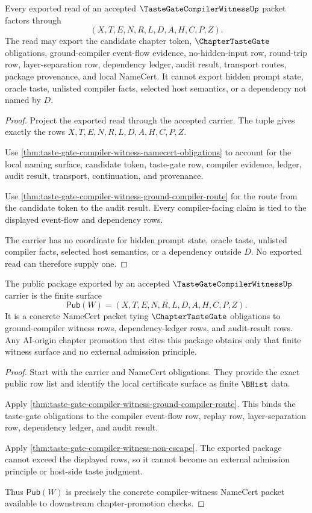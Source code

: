\begin{theorem}
\label{thm:taste-gate-compiler-witness-non-escape}
Every exported read of an accepted $\TasteGateCompilerWitnessUp$ packet factors through
$$
(X,T,E,N,R,L,D,A,H,C,P,Z).
$$
The read may export the candidate chapter token, $\ChapterTasteGate$ obligations, ground-compiler event-flow evidence, no-hidden-input row, round-trip row, layer-separation row, dependency ledger, audit result, transport routes, package provenance, and local NameCert. It cannot export hidden prompt state, oracle taste, unlisted compiler facts, selected host semantics, or a dependency not named by $D$.
\end{theorem}
\begin{proof}
Project the exported read through the accepted carrier. The tuple gives exactly the rows $X,T,E,N,R,L,D,A,H,C,P,Z$.

Use \autoref{thm:taste-gate-compiler-witness-namecert-obligations} to account for the local naming surface, candidate token, taste-gate row, compiler evidence, ledger, audit result, transport, continuation, and provenance.

Use \autoref{thm:taste-gate-compiler-witness-ground-compiler-route} for the route from the candidate token to the audit result. Every compiler-facing claim is tied to the displayed event-flow and dependency rows.

The carrier has no coordinate for hidden prompt state, oracle taste, unlisted compiler facts, selected host semantics, or a dependency outside $D$. No exported read can therefore supply one.
\end{proof}

\begin{theorem}
\label{thm:taste-gate-compiler-witness-public-package}
The public package exported by an accepted $\TasteGateCompilerWitnessUp$ carrier is the finite surface
$$
\mathsf{Pub}(W)=(X,T,E,N,R,L,D,A,H,C,P,Z).
$$
It is a concrete NameCert packet tying $\ChapterTasteGate$ obligations to ground-compiler witness rows, dependency-ledger rows, and audit-result rows. Any AI-origin chapter promotion that cites this package obtains only that finite witness surface and no external admission principle.
\end{theorem}
\begin{proof}
Start with the carrier and NameCert obligations. They provide the exact public row list and identify the local certificate surface as finite $\BHist$ data.

Apply \autoref{thm:taste-gate-compiler-witness-ground-compiler-route}. This binds the taste-gate obligations to the compiler event-flow row, replay row, layer-separation row, dependency ledger, and audit result.

Apply \autoref{thm:taste-gate-compiler-witness-non-escape}. The exported package cannot exceed the displayed rows, so it cannot become an external admission principle or host-side taste judgment.

Thus $\mathsf{Pub}(W)$ is precisely the concrete compiler-witness NameCert packet available to downstream chapter-promotion checks.
\end{proof}

